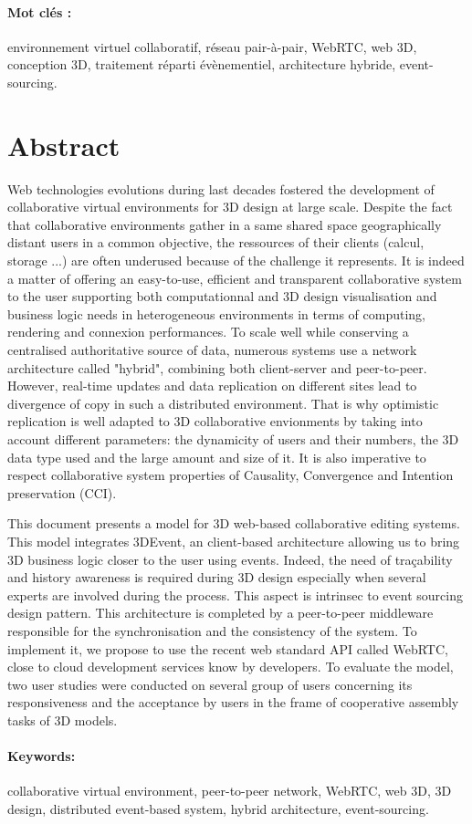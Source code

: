 \paragraph{Mot clés : }environnement virtuel collaboratif, réseau pair-à-pair, WebRTC, web 3D, conception 3D, traitement réparti évènementiel, architecture hybride, event-sourcing.
\pagebreak
\section*{Abstract}

Web technologies evolutions during last decades fostered the development of 
collaborative virtual environments for 3D design at large scale. Despite the fact 
that collaborative environments gather in a same shared space geographically 
distant users in a common objective, the ressources of their clients (calcul, 
storage ...) are often underused because of the challenge it represents. It is indeed 
a matter of offering an easy-to-use, efficient and transparent collaborative system 
to the user supporting both computationnal and 3D design visualisation and 
business logic needs in heterogeneous environments in terms of computing, 
rendering and connexion performances. To scale well while conserving a 
centralised authoritative source of data, numerous systems use a network 
architecture called "hybrid", combining both client-server and peer-to-peer. 
However, real-time updates and data replication on different sites lead to 
divergence of copy in such a distributed environment. That is why optimistic 
replication is well adapted to 3D collaborative envionments by taking into account 
different parameters: the dynamicity of users and their numbers, the 3D data type 
used and the large amount and size of it. It is also imperative to respect 
collaborative system properties of Causality, Convergence and Intention 
preservation (CCI).

This document presents a model for 3D web-based collaborative editing systems. This model integrates 3DEvent, an client-based architecture allowing us to bring 3D business logic closer to the user using events. Indeed, the need of traçability and history awareness is required during 3D design especially when several experts are involved during the process. This aspect is intrinsec to event sourcing design pattern. This architecture is completed by a peer-to-peer middleware responsible for the synchronisation and the consistency of the system. To implement it, we propose to use the recent web standard API called WebRTC, close to cloud development services know by developers. To evaluate the model, two user studies were conducted on several group of users concerning its responsiveness and the acceptance by users in the frame of cooperative assembly tasks of 3D models.




\paragraph{Keywords: }collaborative virtual environment, peer-to-peer network, WebRTC, web 3D, 3D design, distributed event-based system, hybrid architecture, event-sourcing.

\pagebreak